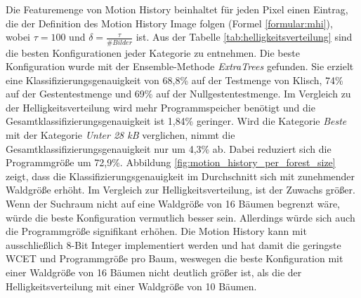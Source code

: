 Die Featuremenge von Motion History beinhaltet für jeden Pixel einen Eintrag, die der Definition des Motion History Image folgen (Formel \ref{formular:mhi}), wobei $\tau=100$ und $\delta=\frac{\tau}{\#Bilder}$ ist.
\newline
\newline
Aus der Tabelle \ref{tab:helligkeitsverteilung} sind die besten Konfigurationen jeder Kategorie zu entnehmen. Die beste Konfiguration wurde mit der Ensemble-Methode \textit{ExtraTrees} gefunden.
Sie erzielt eine Klassifizierungsgenauigkeit von 68,8\% auf der Testmenge von Klisch, 74\% auf der Gestentestmenge und 69\% auf der Nullgestentestmenge. Im Vergleich zu der Helligkeitsverteilung
wird mehr Programmspeicher benötigt und die Gesamtklassifizierungsgenauigkeit ist 1,84\% geringer.
\newline
\newline
Wird die Kategorie \textit{Beste} mit der Kategorie \textit{Unter 28 kB} verglichen, nimmt die Gesamtklassifizierungsgenauigkeit nur um 4,3\% ab. Dabei reduziert sich die Programmgröße um 72,9\%.
Abbildung \ref{fig:motion_history_per_forest_size} zeigt, dass die Klassifizierungsgenauigkeit im Durchschnitt sich mit zunehmender Waldgröße erhöht. Im Vergleich zur Helligkeitsverteilung, ist der Zuwachs größer.
Wenn der Suchraum nicht auf eine Waldgröße von 16 Bäumen begrenzt wäre, würde die beste Konfiguration vermutlich besser sein. Allerdings würde sich auch die Programmgröße signifikant erhöhen.
\newline
\newline
Die Motion History kann mit ausschließlich 8-Bit Integer implementiert werden und hat damit die geringste WCET und Programmgröße pro Baum, weswegen die beste Konfiguration mit einer Waldgröße von 16 Bäumen nicht deutlich
größer ist, als die der Helligkeitsverteilung mit einer Waldgröße von 10 Bäumen.
